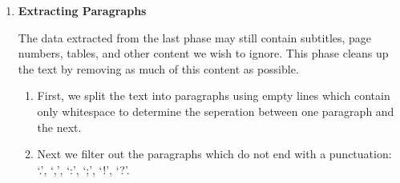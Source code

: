 \begin{enumerate}[A - ]
\begin{enumerate}[1.]
        \end{enumerate}

    \item   {\bf Extracting Paragraphs}

        The data extracted from the last phase may still contain subtitles, page
        numbers, tables, and other content we wish to ignore. This phase cleans up
        the text by removing as much of this content as possible.

        \begin{enumerate}[1.]

            \item   First, we split the text into paragraphs using empty lines which
                    contain only whitespace to determine the seperation between one
                    paragraph and the next.

            \item   Next we filter out the paragraphs which do not end with a punctuation:
                    `.', `,', `:', `;', `!', `?'.

        \end{enumerate}

\end{enumerate}


